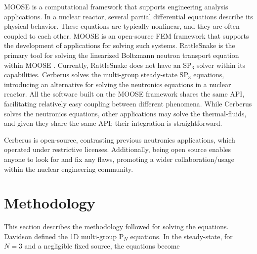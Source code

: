 \documentclass{anstrans}
\begin{document}
\gls{MOOSE} \cite{gaston_moose_2009} is a computational framework that supports engineering analysis applications.
In a nuclear reactor, several partial differential equations describe its physical behavior.
These equations are typically nonlinear, and they are often coupled to each other.
MOOSE is an open-source \gls{FEM} framework that supports the development of applications for solving such systems.
RattleSnake \cite{wang_rattlesnake_2019} is the primary tool for solving the linearized Boltzmann neutron transport equation within MOOSE \cite{fairhurst-agosta_multi-physics_2020}.
Currently, RattleSnake does not have an SP$_3$ solver within its capabilities.
Cerberus solves the multi-group steady-state SP$_3$ equations, introducing an alternative for solving the neutronics equations in a nuclear reactor.
All the software built on the MOOSE framework shares the same \gls{API}, facilitating relatively easy coupling between different phenomena.
While Cerberus solves the neutronics equations, other applications may solve the thermal-fluids, and given they share the same API; their integration is straightforward.

Cerberus is open-source, contrasting previous neutronics applications, which operated under restrictive licenses.
Additionally, being open source enables anyone to look for and fix any flaws, promoting a wider collaboration/usage within the nuclear engineering community.


\section{Methodology}

This section describes the methodology followed for solving the equations.
Davidson \cite{davidson_neutron_1957} defined the 1D multi-group P$_N$ equations.
In the steady-state, for $N=3$ and a negligible fixed source, the equations become
\end{document}
